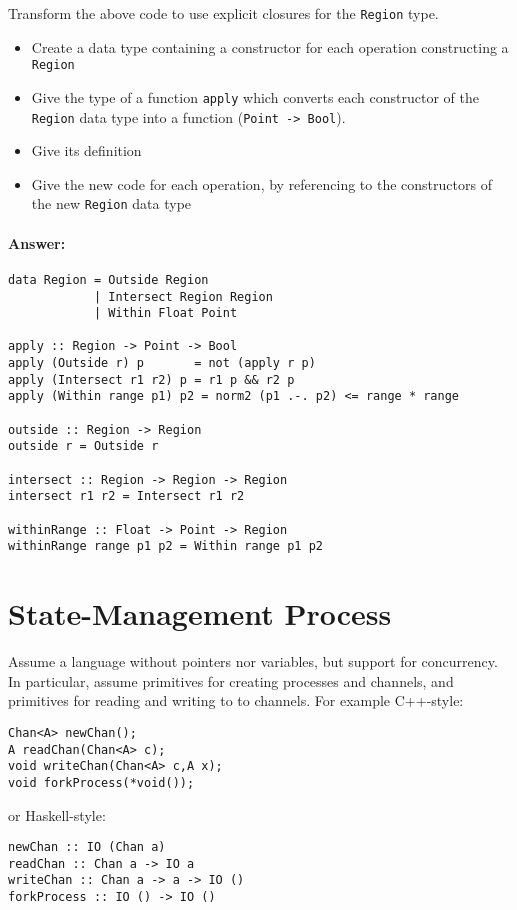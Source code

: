 \documentclass{article}
\newcommand{\answer}[0]{\paragraph{Answer:}}
\begin{document}
Transform the above code to use explicit closures for the
\texttt{Region} type.

\begin{itemize}
\item Create a data type containing a constructor for each operation constructing a \texttt{Region} 
\item Give the type of a function \texttt{apply} which converts each constructor of the \texttt{Region} data type into a function (\texttt{Point -> Bool}). 
\item Give its definition 
\item Give the new code for each operation, by referencing to the constructors of the new \texttt{Region} data type 
\end{itemize}

\answer{
  \begin{verbatim}
data Region = Outside Region
            | Intersect Region Region
            | Within Float Point

apply :: Region -> Point -> Bool
apply (Outside r) p       = not (apply r p)
apply (Intersect r1 r2) p = r1 p && r2 p
apply (Within range p1) p2 = norm2 (p1 .-. p2) <= range * range

outside :: Region -> Region
outside r = Outside r

intersect :: Region -> Region -> Region
intersect r1 r2 = Intersect r1 r2

withinRange :: Float -> Point -> Region
withinRange range p1 p2 = Within range p1 p2
  \end{verbatim}
}

\section{State-Management Process}
Assume a language without pointers nor variables, but support for
concurrency. In particular, assume primitives for creating processes
and channels, and primitives for reading and writing to to
channels. For example C++-style:

\begin{verbatim}
Chan<A> newChan();
A readChan(Chan<A> c);
void writeChan(Chan<A> c,A x);
void forkProcess(*void());
\end{verbatim}
or Haskell-style:
\begin{verbatim}
newChan :: IO (Chan a)
readChan :: Chan a -> IO a
writeChan :: Chan a -> a -> IO ()
forkProcess :: IO () -> IO ()
\end{verbatim}
\end{document}
